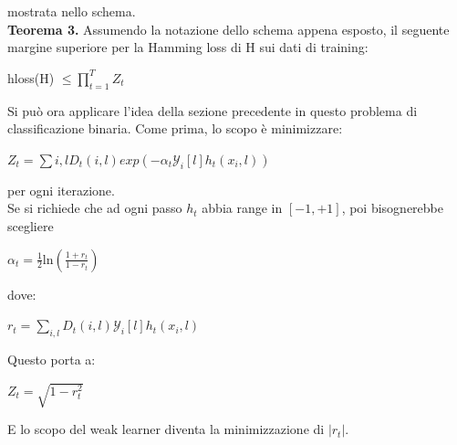 mostrata nello schema. \\
\newline
\textbf{Teorema 3.} Assumendo la notazione dello schema appena esposto, il seguente margine superiore per la 
Hamming loss di H sui dati di training:
\begin{center}hloss(H)
 \begin{math}
  \le \prod_{t=1}^T Z_t
 \end{math}
\end{center}
Si pu\`o ora applicare l'idea della sezione precedente in questo problema di classificazione binaria. Come prima, 
lo scopo \`e minimizzare:
\begin{center}
 \begin{math}
  Z_t = \sum{i,l} D_t(i,l)exp(-\alpha_t \mathcal{Y}_i\left[l\right] h_t (x_i,l))
 \end{math}

\end{center}
per ogni iterazione.\\
\newline
Se si richiede che ad ogni passo \begin{math} h_t  \end{math} abbia range in \begin{math}                                                                                                                                                  
\left[-1,+1\right]\end{math}, 
poi bisognerebbe scegliere 
 \begin{center}
 \begin{math}
  \alpha_t = \frac{1}{2}
 \end{math}ln\begin{math}
              (\frac{1+r_t}{1-r_t})
             \end{math}
\end{center} 
dove:
\begin{center}
 \begin{math}
  r_t = \sum_{i,l} D_t(i,l) \mathcal{Y}_i\left[l\right] h_t (x_i,l)
 \end{math}
\end{center}
Questo porta a:
\begin{center}
 \begin{math}
  Z_t = \sqrt{1-r_t^2}
 \end{math}
\end{center}
E lo scopo del weak learner diventa la minimizzazione di \begin{math}
                                                          |r_t|
                                                         \end{math}.\\
